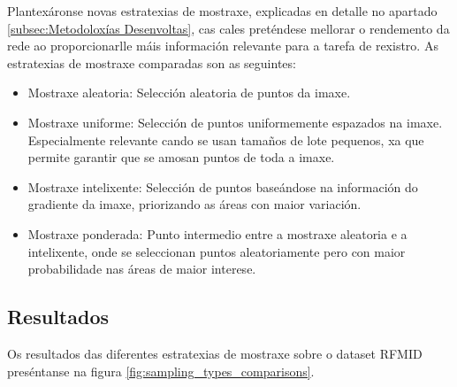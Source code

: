 Plantexáronse novas estratexias de mostraxe, explicadas en detalle no apartado \ref{subsec:Metodoloxías Desenvoltas}, cas cales preténdese mellorar o rendemento da rede ao proporcionarlle máis información relevante para a tarefa de rexistro.
As estratexias de mostraxe comparadas son as seguintes:
\begin{itemize}
    \item Mostraxe aleatoria: Selección aleatoria de puntos da imaxe.
    \item Mostraxe uniforme: Selección de puntos uniformemente espazados na imaxe. Especialmente relevante cando se usan tamaños de lote pequenos, xa que permite garantir que se amosan puntos de toda a imaxe.
    \item Mostraxe intelixente: Selección de puntos baseándose na información do gradiente da imaxe, priorizando as áreas con maior variación.
    \item Mostraxe ponderada: Punto intermedio entre a mostraxe aleatoria e a intelixente, onde se seleccionan puntos aleatoriamente pero con maior probabilidade nas áreas de maior interese.
\end{itemize}

\subsection{Resultados}
\label{subsec:Resultados-sampling}

Os resultados das diferentes estratexias de mostraxe sobre o dataset RFMID preséntanse na figura \ref{fig:sampling_types_comparisons}.

